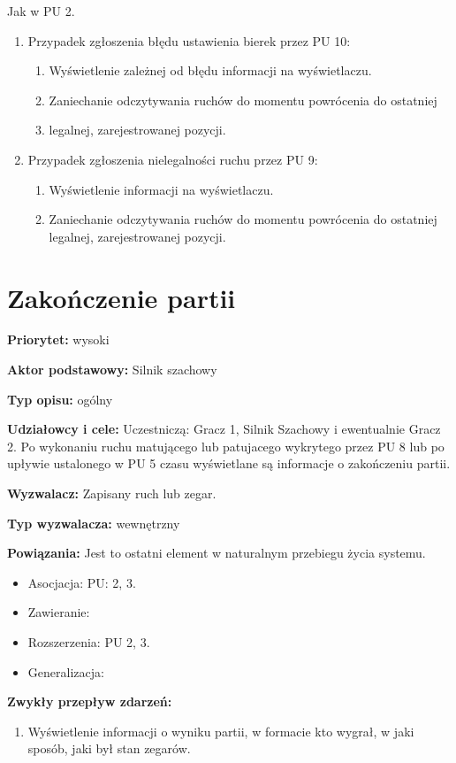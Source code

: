 \documentclass[12pt]{article}
\begin{document}
Jak w PU 2.
\begin{enumerate}
\item Przypadek zgłoszenia błędu ustawienia bierek przez PU 10:
    \begin{enumerate}
    \item Wyświetlenie zależnej od błędu informacji na wyświetlaczu.
    \item Zaniechanie odczytywania ruchów do momentu powrócenia do ostatniej \item legalnej, zarejestrowanej pozycji.
    \end{enumerate}
\item Przypadek zgłoszenia nielegalności ruchu przez PU 9:
    \begin{enumerate}
    \item Wyświetlenie informacji na wyświetlaczu.
    \item Zaniechanie odczytywania ruchów do momentu powrócenia do ostatniej legalnej, zarejestrowanej pozycji.
    \end{enumerate}
\end{enumerate}



\section{Zakończenie partii}

\textbf{Priorytet:} wysoki

\textbf{Aktor podstawowy:} Silnik szachowy

\textbf{Typ opisu:} ogólny

\textbf{Udziałowcy i cele:} 
Uczestniczą: Gracz 1, Silnik Szachowy i ewentualnie Gracz 2. Po wykonaniu ruchu matującego lub patujacego wykrytego przez PU 8 lub po upływie ustalonego w PU 5 czasu wyświetlane są informacje o zakończeniu partii.

\textbf{Wyzwalacz:} Zapisany ruch lub zegar.

\textbf{Typ wyzwalacza:} wewnętrzny

\textbf{Powiązania:} Jest to ostatni element w naturalnym przebiegu życia systemu.
	\begin{itemize}\item Asocjacja: PU: 2, 3.
	\item Zawieranie: 
	\item Rozszerzenia: PU 2, 3.
	\item Generalizacja: 
\end{itemize} 

\textbf{Zwykły przepływ zdarzeń:}  
\begin{enumerate}
\item Wyświetlenie informacji o wyniku partii, w formacie kto wygrał, w jaki sposób, jaki był stan zegarów.
\end{enumerate} 
\end{document}
